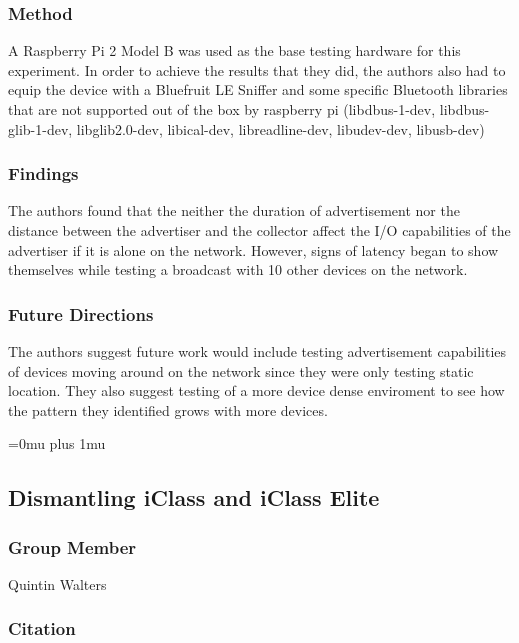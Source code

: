 \subsubsection{Method}

\noindent
A Raspberry Pi 2 Model B was used as the base testing hardware for this experiment. In order to achieve the results that they did, the authors also had to equip the device with a Bluefruit LE Sniffer and some specific Bluetooth libraries that are not supported out of the box by raspberry pi (libdbus-1-dev,  libdbus-glib-1-dev,  libglib2.0-dev,  libical-dev, libreadline-dev, libudev-dev, libusb-dev)

\subsubsection{Findings}

\noindent
The authors found that the neither the duration of advertisement nor the distance between the advertiser and the collector affect the I/O capabilities of the advertiser if it is alone on the network. However, signs of latency began to show themselves while testing a broadcast with 10 other devices on the network.

\subsubsection{Future Directions}

\noindent
The authors suggest future work would include testing advertisement capabilities of devices moving around on the network since they were only testing static location. They also suggest testing of a more device dense enviroment to see how the pattern they identified grows with more devices.

\Urlmuskip=0mu plus 1mu\relax

\noindent
\subsection{Dismantling iClass and iClass Elite}

\subsubsection{Group Member}

\noindent
Quintin Walters

\noindent
\subsubsection{Citation}

